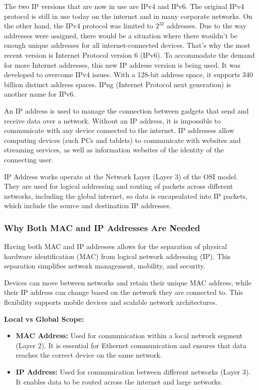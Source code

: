 \documentclass{article}
\begin{document}
The two IP versions that are now in use are IPv4 and IPv6. The original IPv4 protocol is still in use today on the internet and in many corporate networks. On the other hand, the IPv4 protocol was limited to $2^{32}$ addresses. Due to the way addresses were assigned, there would be a situation where there wouldn't be enough unique addresses for all internet-connected devices. That's why the most recent version is Internet Protocol version 6 (IPv6). To accommodate the demand for more Internet addresses, this new IP address version is being used. It was developed to overcome IPv4 issues. With a 128-bit address space, it supports 340 billion distinct address spaces. IPng (Internet Protocol next generation) is another name for IPv6.

An IP address is used to manage the connection between gadgets that send and receive data over a network. Without an IP address, it is impossible to communicate with any device connected to the internet. IP addresses allow computing devices (such PCs and tablets) to communicate with websites and streaming services, as well as information websites of the identity of the connecting user.

IP Address works operate at the Network Layer (Layer 3) of the OSI model. They are used for logical addressing and routing of packets across different networks, including the global internet, so data is encapsulated into IP packets, which include the source and destination IP addresses.

\subsubsection{Why Both MAC and IP Addresses Are Needed}

Having both MAC and IP addresses allows for the separation of physical hardware identification (MAC) from logical network addressing (IP). This separation simplifies network management, mobility, and security. 

Devices can move between networks and retain their unique MAC address, while their IP address can change based on the network they are connected to. This flexibility supports mobile devices and scalable network architectures.

\textbf{Local vs Global Scope:}
\begin{itemize}
    \item \textbf{MAC Address:} Used for communication within a local network segment (Layer 2). It is essential for Ethernet communication and ensures that data reaches the correct device on the same network.
    \item \textbf{IP Address:} Used for communication between different networks (Layer 3). It enables data to be routed across the internet and large networks.
\end{itemize}
\end{document}
